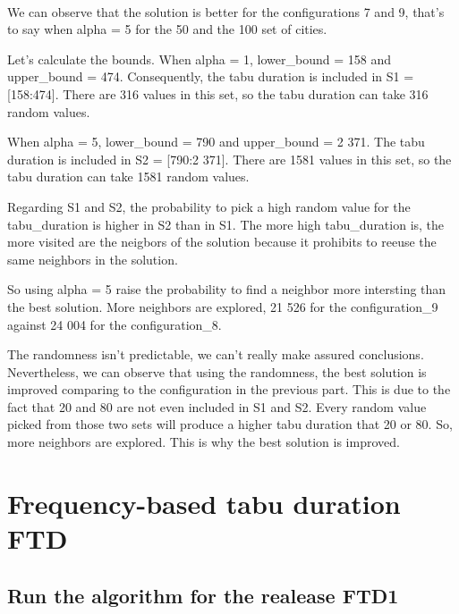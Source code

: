 \documentclass[12pt,oneside,a4paper]{article}
\begin{document}
\paragraph{}
We can observe that the solution is better for the configurations 7 and 9, that's to say when
alpha = 5 for the 50 and the 100 set of cities.

Let's calculate the bounds.
When alpha = 1, lower\_bound = 158 and upper\_bound = 474.
Consequently, the tabu duration is included in S1 = [158:474].
There are 316 values in this set, so the tabu duration can take 316 random values.

When alpha = 5, lower\_bound = 790 and upper\_bound = 2 371.
The tabu duration is included in S2 = [790:2 371].
There are 1581 values in this set, so the tabu duration can take 1581 random values.

Regarding S1 and S2, the probability to pick a high random value for the tabu\_duration is higher in S2 than in S1.
The more high tabu\_duration is, the more visited are the neigbors of the solution because it prohibits to reeuse the
same neighbors in the solution.

So using alpha = 5 raise the probability to find a neighbor more intersting than the best solution. More neighbors
are explored, 21 526 for the configuration\_9 against 24 004 for the configuration\_8.

The randomness isn’t predictable, we can’t really make assured conclusions.
Nevertheless, we can observe that using the randomness, the best solution is improved comparing to the configuration
in the previous part. This is due to the fact that 20 and 80 are not even included in S1 and S2.
Every random value picked from those two sets will produce a higher tabu duration that 20 or 80.
So, more neighbors are explored. This is why the best solution is improved.

\newpage
\section{Frequency-based tabu duration FTD}

\subsection{Run the algorithm for the realease FTD1}
\end{document}

